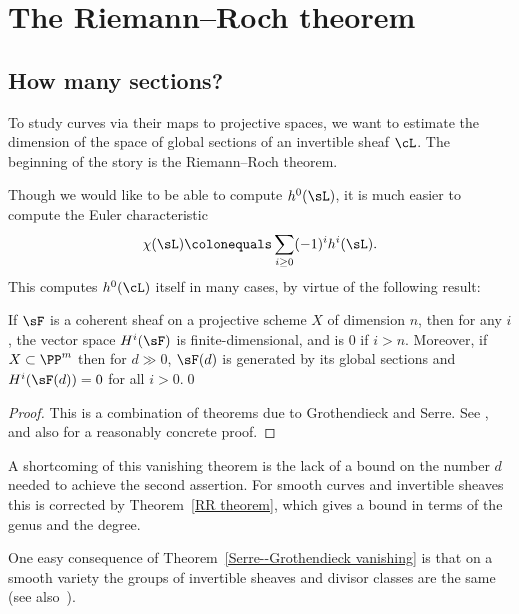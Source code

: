 

\chapter{The Riemann--Roch theorem}\label{RiemannRochChapter}

\section{How many sections?}

To study curves via their maps to projective spaces, we want to estimate the dimension of the space of global
sections of an invertible sheaf $\cL$. The beginning
of the story is the Riemann--Roch theorem.

Though we would like to be able to compute $h^0(\sL)$, it is much
easier to compute the 
Euler characteristic
%
$$
\chi(\sL)\colonequals \sum_{i\geq 0} (-1)^i h^i(\sL).
$$
This computes $h^0(\cL)$ itself in many cases, by virtue of the following result:

\begin{theorem}
\label{Serre--Grothendieck vanishing}
%
%
If $\sF$ is a coherent sheaf on a projective scheme $X$ of dimension $n$, then for any $i$, the vector space $H^i(\sF)$ is finite-dimensional, and is 0 if  $i> n$. Moreover,
if $X\subset \PP^m$ then for $d\gg 0$, $\sF(d)$ is generated by its global sections and $H^i(\sF(d)) = 0$ for all $i>0$.\qed
\unif
\end{theorem}

\begin{proof}
This is a combination of 
theorems due to Grothendieck and Serre. See
\cite[Theorems III.2.7 and III.5.2]{Hartshorne1977}, 
and
also \cite{Serre1955} for a 
reasonably
concrete proof.
\end{proof}

A 
shortcoming
of this vanishing theorem is the lack of a bound on the number $d$ needed to achieve the second assertion. For smooth curves
and invertible sheaves
this is corrected by Theorem~\ref{RR theorem}, which gives a bound in terms of the genus and the degree.

One easy consequence of Theorem~\ref{Serre--Grothendieck vanishing} is
\vadjust{\allowbreak}%
that on a smooth variety the groups of invertible sheaves and divisor
\vadjust{\allowbreak}%
classes are the same (see also~\cite[Proposition
II.6.13]{Hartshorne1977}). 

